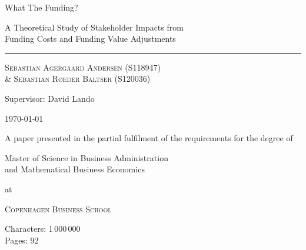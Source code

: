 \documentclass[main.tex]{subfiles}
\begin{document}
	\begin{titlepage}
		\centering
		\vspace{5cm}
		{\fontsize{48pt}{1pt}\selectfont What The Funding? \par}
		\vspace{0.5cm}
		{\Large A Theoretical Study of Stakeholder Impacts from \\ 
				Funding Costs and Funding Value Adjustments \par}
		\rule{\textwidth}{1px}\par
		{\scshape\large 
			Sebastian Agergaard Andersen {\scriptsize(S118947)} \\ %
			\& Sebastian Røeder Baltser {\scriptsize(S120036)} %
		\par}
		Supervisor: David Lando \\
		

		\scalebox{0.95}{%
			\begin{tikzpicture}[remember picture,overlay,shift={(current page.center)}]
				
			\end{tikzpicture}        
		}
		\vfill
		
		{\Large \today \par}		
		{A paper presented in the partial fulfilment
		of the requirements for the degree of \\}
		{\Large Master of Science in Business Administration \\
				and Mathematical Business Economics \par}
		at \par 
		{\scshape\LARGE Copenhagen Business School\par}
		\vspace{0.5cm}
		Characters: 1\,000\,000 \\
		Pages: 92
		
		\thispagestyle{empty}
	\end{titlepage}
\end{document}
